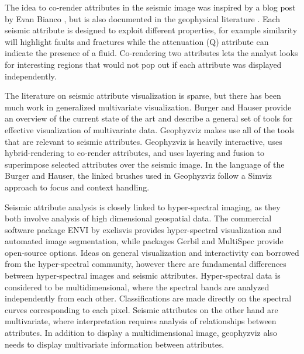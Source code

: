 \documentclass[journal]{vgtc}                %
\begin{document}
The idea to co-render attributes in the seismic image was inspired by a blog post by Evan Bianco \cite{bianco-2015}, but is
also documented in the geophysical literature \cite{chopra-attr}. Each seismic attribute is designed to exploit different
properties, for example similarity will highlight faults and fractures while the attenuation (Q) attribute
can indicate the presence of a fluid. Co-rendering two attributes lets the analyst looks for interesting
regions that would not pop out if each attribute was displayed independently.

The literature on seismic attribute visualization is sparse, but there has been much work in
generalized multivariate visualization. Burger and Hauser \cite{fuchs-vom-2009} provide an overview of the current
state of the art and describe a general set of tools for effective visualization of multivariate data.
Geophyzviz makes use all of the tools that are relevant to seismic attributes. Geophyzviz is
heavily interactive, uses hybrid-rendering to co-render attributes, and uses layering and fusion
to superimpose selected attributes over the seismic image. In the language of the Burger and Hauser,
the linked brushes used in Geophyzviz follow a Simviz approach to focus and context handling.

Seismic attribute analysis is closely linked to hyper-spectral imaging, as they both involve
analysis of high dimensional geospatial data. The commercial software package ENVI \cite{itt-sol} by
exelisvis provides hyper-spectral visualization and automated image segmentation, while
packages Gerbil \cite{gerbil} and MultiSpec \cite{multispec} provide open-source options. Ideas on general visualization
and interactivity can borrowed from the hyper-spectral community, however there are fundamental
differences between hyper-spectral images and seismic attributes. Hyper-spectral data is considered
to be multidimensional, where the spectral bands are analyzed independently from each other.
Classifications are made directly on the spectral curves corresponding to each pixel. Seismic
attributes on the other hand are multivariate, where interpretation requires analysis of
relationships between attributes. In addition to display a multidimensional image, geophyzviz
also needs to display multivariate information between attributes.
\end{document}
